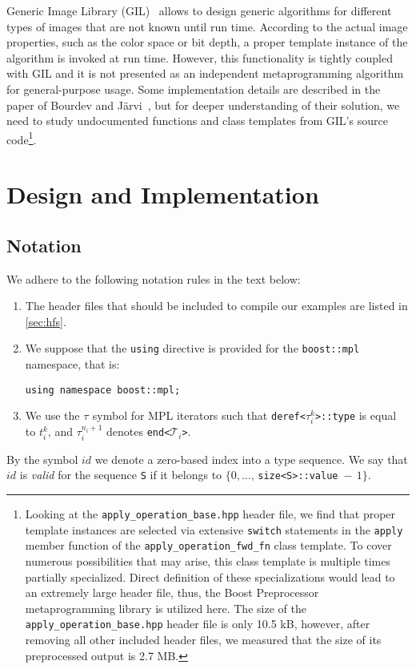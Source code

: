 \documentclass[10pt,a4paper]{article}
\theoremstyle{definition}\newtheorem{problem}{Problem}
\providecommand{\symtypeset}[1]{\ensuremath{\mathcal{T}_{#1}}}
\providecommand{\symtype}[2]{\ensuremath{t_{#1}^{#2}}}
\providecommand{\symiter}[2]{\ensuremath{\tau_{#1}^{#2}}}
\providecommand{\symiterend}[1]{\ensuremath{\tau_{#1}^{n_i+1}}}
\providecommand{\symidb}{\ensuremath{\mathit{id}}}
\providecommand{\symidbx}{\symidb\xspace}
\begin{document}
Generic Image Library (GIL)~\cite{RefWorks:86} allows to design generic algorithms for different types of images that are not known until run time. According to the actual image properties, such as the color space or bit depth, a proper template instance of the algorithm is invoked at run time. However, this functionality is tightly coupled with GIL and it is not presented as an independent metaprogramming algorithm for general-purpose usage. Some implementation details are described in the paper of Bourdev and J\"arvi~\cite{RefWorks:60}, but for deeper understanding of their solution, we need to study undocumented functions and class templates from GIL's source code\footnote{Looking at the \texttt{apply\_operation\_base.hpp} header file, we find that proper template instances are selected via extensive \texttt{switch} statements in the \texttt{apply} member function of the \texttt{apply\_ope\-ra\-tion\_fwd\_fn} class template. To cover numerous possibilities that may arise, this class template is multiple times partially specialized. Direct definition of these specializations would lead to an extremely large header file, thus, the Boost Preprocessor metaprogramming library is utilized here. The size of the \texttt{apply\_operation\_base.hpp} header file is only 10.5 kB, however, after removing all other included header files, we measured that the size of its preprocessed output is 2.7 MB.
}.

\section{Design and Implementation}
\label{sec:design}

\subsection{Notation}

We adhere to the following notation rules in the text below:
\begin{enumerate}

\item The header files that should be included to compile our examples are listed in \autoref{sec:hfs}.

\item We suppose that the \texttt{using} directive is provided for the \texttt{boost::mpl} namespace, that is:
\begin{lstlisting}
using namespace boost::mpl;
\end{lstlisting}


\item We use the \symiter{}{} symbol for MPL iterators such that \texttt{deref<}\symiter{i}{k}\texttt{>::type} is equal to \symtype{i}{k},
and \symiterend{i} denotes \texttt{end<}\symtypeset{i}\texttt{>}.

\end{enumerate}
By the symbol \symidbx we denote a zero-based index into a type sequence. We say that \symidbx is \emph{valid} for the sequence \texttt{S} if it belongs to $\{0,\ldots,\,$\texttt{size<S>::value}$\;-\,1\}$.
\end{document}
